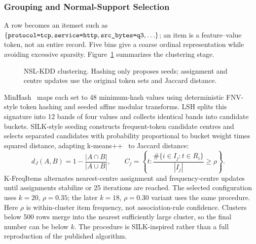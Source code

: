 \documentclass[10pt,a4paper]{article}
\begin{document}
\subsubsection{Grouping and Normal-Support Selection}
A row becomes an itemset such as $\{\texttt{protocol=tcp},\texttt{service=http},\texttt{src\_\allowbreak bytes=q3},\ldots\}$; an item is a feature--value token, not an entire record. Five bins give a coarse ordinal representation while avoiding excessive sparsity. Figure~\ref{fig:silk} summarizes the clustering stage.
\begin{figure}[H]\centering
{}
\caption{NSL-KDD clustering. Hashing only proposes seeds; assignment and centre updates use the original token sets and Jaccard distance.}\label{fig:silk}
\end{figure}
MinHash~\cite{minhash} maps each set to 48 minimum-hash values using deterministic FNV-style token hashing and seeded affine modular transforms. LSH splits this signature into 12 bands of four values and collects identical bands into candidate buckets. SILK-style seeding constructs frequent-token candidate centres and selects separated candidates with probability proportional to bucket weight times squared distance, adapting k-means++~\cite{kmpp} to Jaccard distance:
\begin{equation}
d_J(A,B)=1-\frac{|A\cap B|}{|A\cup B|},\qquad
C_j=\left\{t:\frac{\#\{i\in I_j:t\in R_i\}}{|I_j|}\ge\rho\right\}.
\end{equation}
K-FreqItems alternates nearest-centre assignment and frequency-centre updates until assignments stabilize or 25 iterations are reached. The selected configuration uses $k=20$, $\rho=0.35$; the later $k=18$, $\rho=0.30$ variant uses the same procedure. Here $\rho$ is within-cluster item frequency, not association-rule confidence. Clusters below 500 rows merge into the nearest sufficiently large cluster, so the final number can be below $k$. The procedure is SILK-inspired rather than a full reproduction of the published algorithm.
\end{document}
